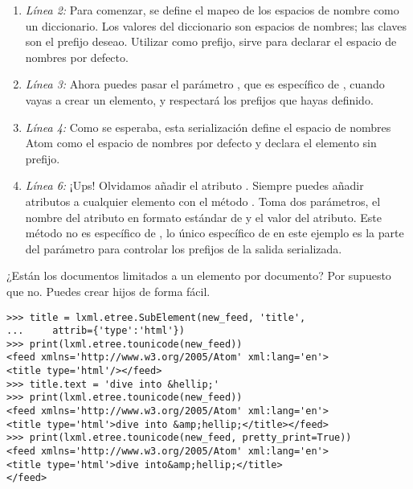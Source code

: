 \begin{enumerate}

\item \emph{Línea 2:} Para comenzar, se define el mapeo de los espacios de nombre como un diccionario. Los valores del diccionario son espacios de nombres; las claves son el prefijo deseao. Utilizar  como prefijo, sirve para declarar el espacio de nombres por defecto.

\item \emph{Línea 3:} Ahora puedes pasar el parámetro , que es específico de , cuando vayas a crear un elemento, y  respectará los prefijos que hayas definido.

\item \emph{Línea 4:} Como se esperaba, esta serialización define el espacio de nombres Atom como el espacio de nombres por defecto y declara el elemento  sin prefijo.

\item \emph{Línea 6:} ¡Ups! Olvidamos añadir el atributo . Siempre puedes añadir atributos a cualquier elemento con el método . Toma dos parámetros, el nombre del atributo en formato estándar de  y el valor del atributo. Este método no es específico de , lo único específico de  en este ejemplo es la parte del parámetro  para controlar los prefijos de la salida serializada.

\end{enumerate}

¿Están los documentos  limitados a un elemento por documento? Por supuesto que no. Puedes crear hijos de forma fácil.

\noindent\begin{minipage}{\textwidth}
\begin{lstlisting}[mathescape=True]
>>> title = lxml.etree.SubElement(new_feed, 'title',
...     attrib={'type':'html'})
>>> print(lxml.etree.tounicode(new_feed))
<feed xmlns='http://www.w3.org/2005/Atom' xml:lang='en'>
<title type='html'/></feed>
>>> title.text = 'dive into &hellip;'
>>> print(lxml.etree.tounicode(new_feed))
<feed xmlns='http://www.w3.org/2005/Atom' xml:lang='en'>
<title type='html'>dive into &amp;hellip;</title></feed>
>>> print(lxml.etree.tounicode(new_feed, pretty_print=True))
<feed xmlns='http://www.w3.org/2005/Atom' xml:lang='en'>
<title type='html'>dive into&amp;hellip;</title>
</feed>
\end{lstlisting}
\end{minipage}

